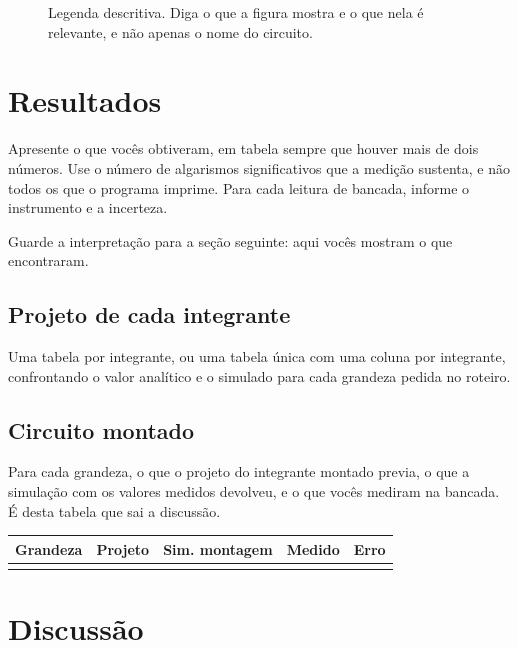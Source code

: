 \documentclass[11pt,a4paper]{article}
\begin{document}
\begin{figure}[htb]
\centering
\caption{Legenda descritiva. Diga o que a figura mostra e o que nela é relevante, e não
apenas o nome do circuito.}
\label{fig:exemplo}
\end{figure}

\section{Resultados}

Apresente o que vocês obtiveram, em tabela sempre que houver mais de dois números. Use o
número de algarismos significativos que a medição sustenta, e não todos os que o programa
imprime. Para cada leitura de bancada, informe o instrumento e a incerteza.

Guarde a interpretação para a seção seguinte: aqui vocês mostram o que encontraram.

\subsection{Projeto de cada integrante}

Uma tabela por integrante, ou uma tabela única com uma coluna por integrante, confrontando
o valor analítico e o simulado para cada grandeza pedida no roteiro.

\subsection{Circuito montado}

Para cada grandeza, o que o projeto do integrante montado previa, o que a simulação com os
valores medidos devolveu, e o que vocês mediram na bancada. É desta tabela que sai a
discussão.

\begin{center}
\begin{tabular}{@{}lrrrr@{}}
\toprule
\textbf{Grandeza} & \textbf{Projeto} & \textbf{Sim. montagem} & \textbf{Medido} &
\textbf{Erro} \\
\midrule
& & & & \\
\bottomrule
\end{tabular}
\end{center}

\section{Discussão}
\end{document}
